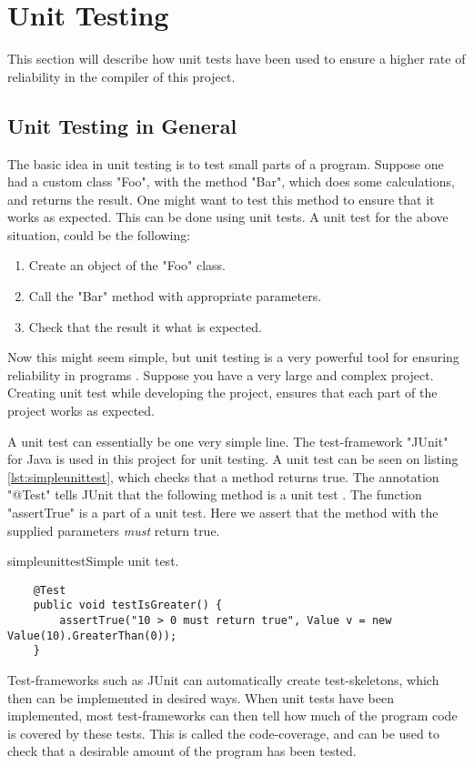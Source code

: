 \section{Unit Testing}
This section will describe how unit tests have been used to ensure a higher rate of reliability in the compiler of this project. 

\subsection{Unit Testing in General}
The basic idea in unit testing is to test small parts of a program. Suppose one had a custom class "Foo", with the method "Bar", which does some calculations, and returns the result. One might want to test this method to ensure that it works as expected. This can be done using unit tests. A unit test for the above situation, could be the following:
\begin{enumerate}
	\item Create an object of the "Foo" class.
	\item Call the "Bar" method with appropriate parameters. 
	\item Check that the result it what is expected.
\end{enumerate}
Now this might seem simple, but unit testing is a very powerful tool for ensuring reliability in programs \citep{unittestpower}. Suppose you have a very large and complex project. Creating unit test while developing the project, ensures that each part of the project works as expected.

A unit test can essentially be one very simple line. The test-framework "JUnit" for Java is used in this project for unit testing. A unit test can be seen on listing \ref{lst:simpleunittest}, which checks that a method returns true. The annotation "@Test" tells JUnit that the following method is a unit test \citep{junit}. The function "assertTrue" is a part of a unit test. Here we assert that the method with the supplied parameters \emph{must} return true.

\begin{code}{simpleunittest}{Simple unit test.}
\begin{lstlisting}
	@Test
	public void testIsGreater() {
	    assertTrue("10 > 0 must return true", Value v = new Value(10).GreaterThan(0));
	}
\end{lstlisting}
\end{code}

Test-frameworks such as JUnit can automatically create test-skeletons, which then can be implemented in desired ways. When unit tests have been implemented, most test-frameworks can then tell how much of the program code is covered by these tests. This is called the code-coverage, and can be used to check that a desirable amount of the program has been tested.

